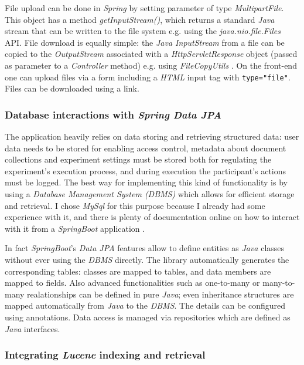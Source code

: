 \documentclass[a4paper]{usiinfbachelorproject}
\begin{document}
File upload can be done in \emph{Spring} by setting parameter of type \emph{MultipartFile}. This object has a method
\emph{getInputStream()}, which returns a standard \emph{Java} stream that can be written to the file system e.g. using
the \emph{java.nio.file.Files} API. File download is equally simple: the \emph{Java InputStream} from a file can be copied to
the \emph{OutputStream} associated with a \emph{HttpServletResponse} object (passed as parameter to a \emph{Controller} method)
e.g. using \emph{FileCopyUtils} \cite{springFileUpload}. On the front-end one can upload files via a form including a
\emph{HTML} input tag with \texttt{type="file"}. Files can be downloaded using a link.

\subsubsection{\textbf{Database interactions with \emph{Spring Data JPA}}} \label{sec:archOverallDb}

The application heavily relies on data storing and retrieving structured data: user data
needs to be stored for enabling access control, metadata about document collections and experiment settings
must be stored both for regulating the experiment's execution process, and during execution the participant's
actions must be logged. The best way for implementing this kind of functionality is by using a
\emph{Database Management System (DBMS)} which allows for efficient storage and retrieval.
I chose \emph{MySql} for this purpose because I already had some experience with it, and there is plenty of documentation online on how to 
interact with it from a \emph{SpringBoot} application \cite{springJpaReference} \cite{springJpaTutorial}.

In fact \emph{SpringBoot}'s \emph{Data JPA} features allow to define entities as \emph{Java} classes without ever using the \emph{DBMS} directly.
The library automatically generates the corresponding tables: classes are mapped to tables, and data members are mapped to fields. Also advanced functionalities such as one-to-many or many-to-many realationships
can be defined in pure \emph{Java}; even inheritance structures are mapped automatically from \emph{Java} to the \emph{DBMS}. The
details can be configured using annotations.
Data access is managed via repositories which are defined as \emph{Java} interfaces.

\subsubsection{\textbf{Integrating \emph{Lucene} indexing and retrieval}}
\end{document}
